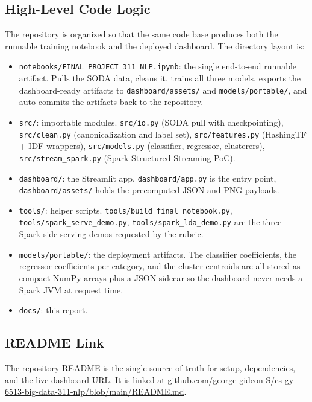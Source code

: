 \documentclass[11pt,letterpaper]{article}
\begin{document}
\subsection{High-Level Code Logic}

The repository is organized so that the same code base produces both the runnable training notebook and the deployed dashboard. The directory layout is:

\begin{itemize}
  \item \texttt{notebooks/FINAL\_PROJECT\_311\_NLP.ipynb}: the single end-to-end runnable artifact. Pulls the SODA data, cleans it, trains all three models, exports the dashboard-ready artifacts to \texttt{dashboard/assets/} and \texttt{models/portable/}, and auto-commits the artifacts back to the repository.
  \item \texttt{src/}: importable modules. \texttt{src/io.py} (SODA pull with checkpointing), \texttt{src/clean.py} (canonicalization and label set), \texttt{src/features.py} (HashingTF + IDF wrappers), \texttt{src/models.py} (classifier, regressor, clusterers), \texttt{src/stream\_spark.py} (Spark Structured Streaming PoC).
  \item \texttt{dashboard/}: the Streamlit app. \texttt{dashboard/app.py} is the entry point, \texttt{dashboard/assets/} holds the precomputed JSON and PNG payloads.
  \item \texttt{tools/}: helper scripts. \texttt{tools/build\_final\_notebook.py}, \texttt{tools/spark\_serve\_demo.py}, \texttt{tools/spark\_lda\_demo.py} are the three Spark-side serving demos requested by the rubric.
  \item \texttt{models/portable/}: the deployment artifacts. The classifier coefficients, the regressor coefficients per category, and the cluster centroids are all stored as compact NumPy arrays plus a JSON sidecar so the dashboard never needs a Spark JVM at request time.
  \item \texttt{docs/}: this report.
\end{itemize}

\subsection{README Link}

The repository README is the single source of truth for setup, dependencies, and the live dashboard URL. It is linked at \href{https://github.com/george-gideon-S/cs-gy-6513-big-data-311-nlp/blob/main/README.md}{github.com/george-gideon-S/cs-gy-6513-big-data-311-nlp/blob/main/README.md}.
\end{document}
